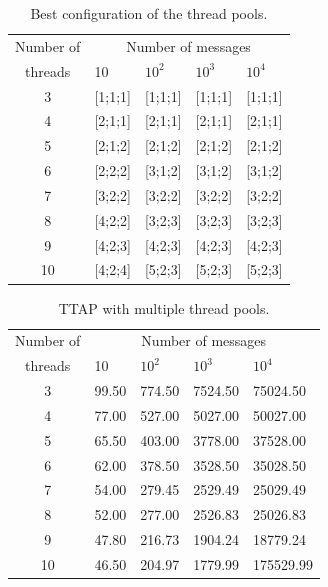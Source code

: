 %
\begin{table}[htb]
\centering
\caption{Best configuration of the thread pools.}
\label{tab:best_config}
\begin{tabular}{cllll}
\hline
\multicolumn{1}{c}{Number of}  & \multicolumn{4}{c}{Number of messages} \\
\multicolumn{1}{c}{threads}   & 10           & $10^2$        & $10^3$         & $10^4$          \\ \hline
3                             & [1;1;1]      & [1;1;1]       & [1;1;1]        & [1;1;1]       \\
4                             & [2;1;1]      & [2;1;1]       & [2;1;1]        & [2;1;1]      \\
5                             & [2;1;2]      & [2;1;2]       & [2;1;2]        & [2;1;2]       \\
6                             & [2;2;2]      & [3;1;2]       & [3;1;2]        & [3;1;2]      \\
7                             & [3;2;2]      & [3;2;2]       & [3;2;2]        & [3;2;2]        \\
8                             & [4;2;2]      & [3;2;3]       & [3;2;3]        & [3;2;3]         \\
9                             & [4;2;3]      & [4;2;3]       & [4;2;3]        & [4;2;3]       \\
10                            & [4;2;4]      & [5;2;3]       & [5;2;3]        & [5;2;3]      \\ \hline
\end{tabular}
\end{table}  
%
\begin{table}[htb]
\centering
\caption{TTAP with multiple thread pools.}
\label{tab:TTAP_multiplo}
\begin{tabular}{cllll}
\hline
\multicolumn{1}{c}{Number of} & \multicolumn{4}{c}{Number of messages} \\
\multicolumn{1}{c}{threads}   & 10         & $10^2$       & $10^3$        & $10^4$          \\ \hline
3                             & 99.50      & 774.50       & 7524.50        & 75024.50       \\
4                             & 77.00      & 527.00       & 5027.00        & 50027.00       \\
5                             & 65.50      & 403.00       & 3778.00        & 37528.00       \\
6                             & 62.00      & 378.50       & 3528.50        & 35028.50       \\
7                             & 54.00      & 279.45       & 2529.49        & 25029.49        \\
8                             & 52.00      & 277.00       & 2526.83        & 25026.83        \\
9                             & 47.80      & 216.73       & 1904.24        & 18779.24        \\
10                            & 46.50      & 204.97       & 1779.99        & 175529.99        \\ \hline
\end{tabular}
\end{table}  
